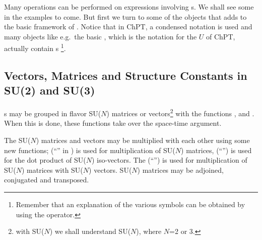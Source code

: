 Many operations can be performed on expressions involving s. We shall see some in
the examples to come. But first we turn to some of the objects that \fphi adds to the basic
framework of \fc. Notice that in ChPT, a condensed notation is used and many objects like e.g.~the
basic , which is the \fphi notation for the $U$ of ChPT, actually contain
s \footnote{Remember that an explanation of the various symbols can be obtained
by using the  operator.}.

\subsection{Vectors, Matrices and Structure Constants in SU(2) and SU(3)}

s may be grouped in flavor SU($N$) matrices or vectors\footnote{with SU($N$) we shall understand  SU($N$), where $N$=2 or 3.} with the functions ,  and . When this is done, these functions take over the space-time argument.



The SU($N$) matrices and vectors may be multiplied with each other using some new functions;  (``\mb{$\SixPointedStar$}'' in ) is used for multiplication of SU($N$) matrices,  (``\mb{$\cdot$}'') is used for the dot product of SU($N$) iso-vectors. The \mma {} (``'') is used for multiplication of SU($N$) matrices with SU($N$) vectors. SU($N$) matrices may be adjoined, conjugated and transposed.

\beom
{}
\enom

